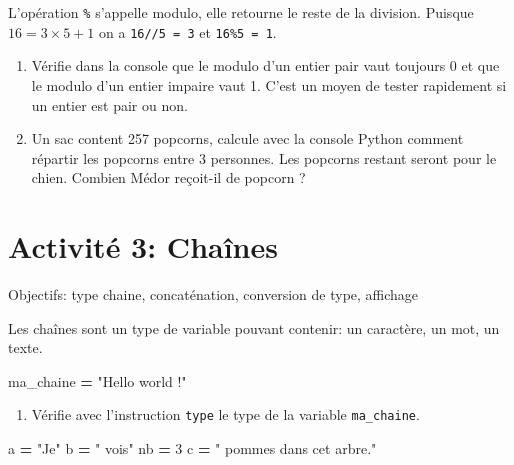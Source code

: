 \documentclass[
]{book}
\newenvironment{Shaded}{\begin{snugshade}}{\end{snugshade}}
\newcommand{\DecValTok}[1]{\textcolor[rgb]{0.00,0.00,0.81}{#1}}
\newcommand{\NormalTok}[1]{#1}
\newcommand{\OperatorTok}[1]{\textcolor[rgb]{0.81,0.36,0.00}{\textbf{#1}}}
\newcommand{\StringTok}[1]{\textcolor[rgb]{0.31,0.60,0.02}{#1}}
\providecommand{\tightlist}{%
  \setlength{\itemsep}{0pt}\setlength{\parskip}{0pt}}
\def\tightlist{}
\begin{document}
L'opération \texttt{\%} s'appelle modulo, elle retourne le reste de la division. Puisque \(16= 3\times 5 + 1\) on a \texttt{16//5\ =\ 3} et \texttt{16\%5\ =\ 1}.

\begin{enumerate}
\def\labelenumi{\arabic{enumi}.}
\setcounter{enumi}{3}
\tightlist
\item
  Vérifie dans la console que le modulo d'un entier pair vaut toujours 0 et que le modulo d'un entier impaire vaut 1. C'est un moyen de tester rapidement si un entier est pair ou non.
\item
  Un sac content 257 popcorns, calcule avec la console Python comment répartir les popcorns entre 3 personnes. Les popcorns restant seront pour le chien. Combien Médor reçoit-il de popcorn ?
\end{enumerate}

\newpage

\hypertarget{activituxe9-3-chauxeenes}{%
\section{Activité 3: Chaînes}\label{activituxe9-3-chauxeenes}}

Objectifs: type chaine, concaténation, conversion de type, affichage

Les chaînes sont un type de variable pouvant contenir: un caractère, un mot, un texte.

\begin{Shaded}
\begin{Highlighting}[]
\NormalTok{ma\_chaine }\OperatorTok{=} \StringTok{"Hello world !"}
\end{Highlighting}
\end{Shaded}

\begin{enumerate}
\def\labelenumi{\arabic{enumi}.}
\tightlist
\item
  Vérifie avec l'instruction \texttt{type} le type de la variable \texttt{ma\_chaine}.
\end{enumerate}

\begin{Shaded}
\begin{Highlighting}[]
\NormalTok{a }\OperatorTok{=} \StringTok{"Je"}
\NormalTok{b }\OperatorTok{=} \StringTok{" vois"}
\NormalTok{nb }\OperatorTok{=} \DecValTok{3}
\NormalTok{c }\OperatorTok{=} \StringTok{" pommes dans cet arbre."}
\end{Highlighting}
\end{Shaded}
\end{document}
